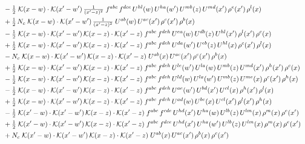 \documentclass[10pt]{article}
\numberwithin{equation}{section}
\begin{document}
\begin{align}
&\quad -\tfrac{1}{2}\;\mathcal{K}(x-w)\cdot\mathcal{K}(x'-w')\,\tfrac{1}{(x'-z)^{2}}\;f^{abc}\,f^{dce}\,U^{hl}(w)\,U^{ha}(w')\,U^{mb}(z)\,U^{md}(x')\,\rho^{e}(x')\,\rho^{l}(x)\notag\\
&\quad +\tfrac{1}{2}\,N_c\;\mathcal{K}(x-w)\cdot\mathcal{K}(x'-w')\,\tfrac{1}{(x'-z)^{2}}\;U^{ab}(w)\,U^{ac}(x')\,\rho^{c}(x')\,\rho^{b}(x)\notag\\
&\quad -\tfrac{1}{2}\;\mathcal{K}(x-w)\cdot\mathcal{K}(x'-w')\,\mathcal{K}(x-z)\cdot\mathcal{K}(x'-z)\;f^{abc}\,f^{deh}\,U^{ea}(w)\,U^{db}(z)\,U^{hl}(x')\,\rho^{l}(x')\,\rho^{c}(x)\notag\\
&\quad +\tfrac{1}{2}\;\mathcal{K}(x-w)\cdot\mathcal{K}(x'-w')\,\mathcal{K}(x-z)\cdot\mathcal{K}(x'-z)\;f^{abc}\,f^{deh}\,U^{da}(w')\,U^{eb}(z)\,U^{hl}(x)\,\rho^{c}(x')\,\rho^{l}(x)\notag\\
&\quad -N_c\;\mathcal{K}(x-w)\cdot\mathcal{K}(x'-w')\,\mathcal{K}(x-z)\cdot\mathcal{K}(x'-z)\;U^{ab}(x)\,U^{ac}(x')\,\rho^{c}(x')\,\rho^{b}(x)\notag\\
&\quad +\tfrac{1}{2}\;\mathcal{K}(x-w)\cdot\mathcal{K}(x'-w')\,\mathcal{K}(x-z)\cdot\mathcal{K}(x'-z)\;f^{abc}\,f^{deh}\,U^{le}(w')\,U^{la}(w)\,U^{mb}(z)\,U^{md}(x')\,\rho^{h}(x')\,\rho^{c}(x)\notag\\
&\quad -\tfrac{1}{2}\;\mathcal{K}(x-w)\cdot\mathcal{K}(x'-w')\,\mathcal{K}(x-z)\cdot\mathcal{K}(x'-z)\;f^{abc}\,f^{deh}\,U^{ld}(w)\,U^{la}(w')\,U^{mb}(z)\,U^{me}(x)\,\rho^{c}(x')\,\rho^{h}(x)\notag\\
&\quad -\tfrac{1}{2}\;\mathcal{K}(x-w)\cdot\mathcal{K}(x'-w')\,\mathcal{K}(x-z)\cdot\mathcal{K}(x'-z)\;f^{abc}\,f^{deh}\,U^{ae}(w')\,U^{bd}(x')\,U^{cl}(x)\,\rho^{h}(x')\,\rho^{l}(x)\notag\\
&\quad +\tfrac{1}{2}\;\mathcal{K}(x-w)\cdot\mathcal{K}(x'-w')\,\mathcal{K}(x-z)\cdot\mathcal{K}(x'-z)\;f^{abc}\,f^{deh}\,U^{ad}(w)\,U^{be}(x)\,U^{cl}(x')\,\rho^{l}(x')\,\rho^{h}(x)\notag\\
&\quad -\tfrac{1}{2}\;\mathcal{K}(x'-w)\cdot\mathcal{K}(x'-w')\,\mathcal{K}(x-z)\cdot\mathcal{K}(x'-z)\;f^{abc}\,f^{cde}\,U^{hd}(x')\,U^{ha}(w)\,U^{lb}(z)\,U^{lm}(x)\,\rho^{m}(x)\,\rho^{e}(x')\notag\\
&\quad +\tfrac{1}{2}\;\mathcal{K}(x'-w)\cdot\mathcal{K}(x'-w')\,\mathcal{K}(x-z)\cdot\mathcal{K}(x'-z)\;f^{abc}\,f^{dce}\,U^{hd}(x')\,U^{ha}(w')\,U^{lb}(z)\,U^{lm}(x)\,\rho^{m}(x)\,\rho^{e}(x')\notag\\
&\quad +N_c\;\mathcal{K}(x'-w)\cdot\mathcal{K}(x'-w')\,\mathcal{K}(x-z)\cdot\mathcal{K}(x'-z)\;U^{ab}(x)\,U^{ac}(x')\,\rho^{b}(x)\,\rho^{c}(x')\notag\\

\end{align}
\end{document}
